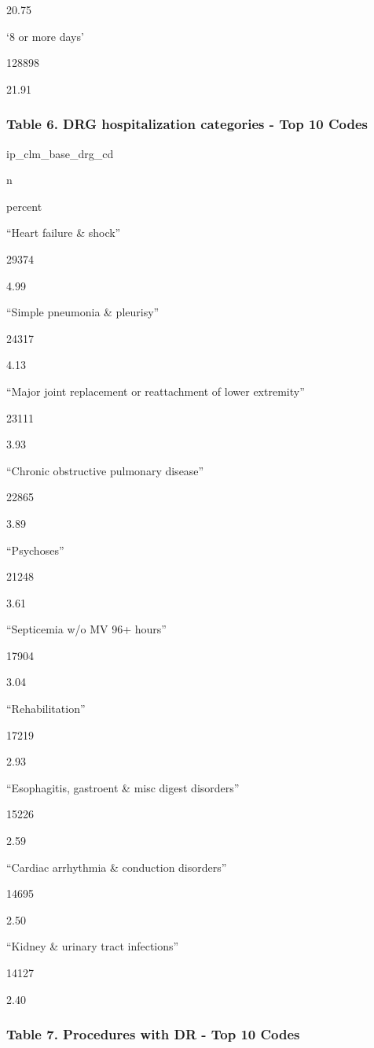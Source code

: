 \documentclass[]{article}
\begin{document}
20.75

`8 or more days'

128898

21.91

\hypertarget{table-6.-drg-hospitalization-categories---top-10-codes}{%
\subsubsection{Table 6. DRG hospitalization categories - Top 10
Codes}\label{table-6.-drg-hospitalization-categories---top-10-codes}}

ip\_clm\_base\_drg\_cd

n

percent

``Heart failure \& shock''

29374

4.99

``Simple pneumonia \& pleurisy''

24317

4.13

``Major joint replacement or reattachment of lower extremity''

23111

3.93

``Chronic obstructive pulmonary disease''

22865

3.89

``Psychoses''

21248

3.61

``Septicemia w/o MV 96+ hours''

17904

3.04

``Rehabilitation''

17219

2.93

``Esophagitis, gastroent \& misc digest disorders''

15226

2.59

``Cardiac arrhythmia \& conduction disorders''

14695

2.50

``Kidney \& urinary tract infections''

14127

2.40

\hypertarget{table-7.-procedures-with-dr---top-10-codes}{%
\subsubsection{Table 7. Procedures with DR - Top 10
Codes}\label{table-7.-procedures-with-dr---top-10-codes}}
\end{document}
